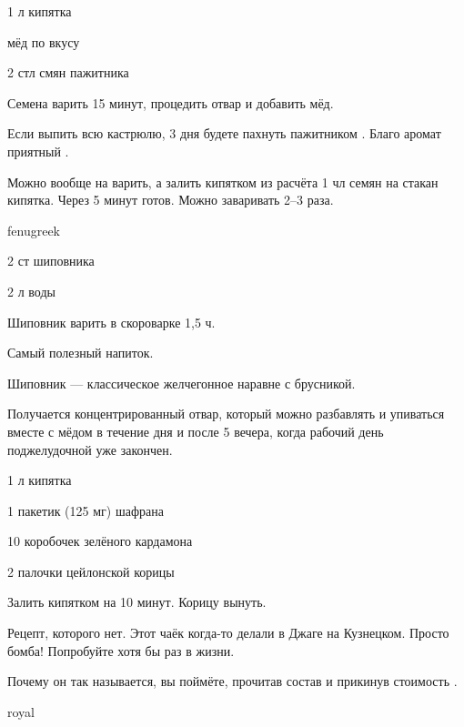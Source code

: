 {
\item 1 л кипятка
\item мёд по вкусу
}{
\item 2 стл смян пажитника
}{
Семена варить 15 минут, процедить отвар и добавить мёд.
}{
\begin{advice}
\item Если выпить всю кастрюлю, 3 дня будете пахнуть пажитником \faSmileO. Благо аромат приятный \faSmileO.
\item Можно вообще на варить, а залить кипятком из расчёта 1 чл семян на стакан кипятка. Через 5 минут готов. Можно заваривать 2–3 раза. 
\end{advice}}{fenugreek}



{
\item 2 ст шиповника
\item 2 л воды
}{
\item[] 
}{
Шиповник варить в скороварке 1,5 ч.
}{
\begin{advice}
    \item Самый полезный напиток.
    \item Шиповник — классическое желчегонное наравне с брусникой.
\item Получается концентрированный отвар, который можно разбавлять и упиваться вместе с мёдом в течение дня и после 5 вечера, когда рабочий день поджелудочной уже закончен. 

\end{advice}}{}





{
\item  1 л кипятка
}{
\item 1 пакетик (125 мг) шафрана 
\item 10 коробочек зелёного кардамона
\item 2 палочки цейлонской корицы
}{
Залить кипятком на 10 минут. Корицу вынуть.
}{
\begin{advice}
\item Рецепт, которого нет. Этот чаёк когда-то делали в Джаге на Кузнецком. Просто бомба! Попробуйте хотя бы раз в жизни. 
 \item Почему он так называется, вы поймёте, прочитав состав и прикинув стоимость \faSmileO.
\end{advice}}{royal}





